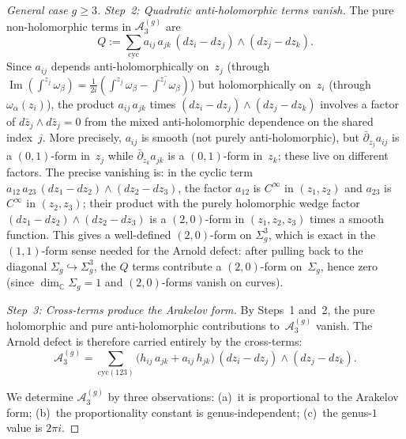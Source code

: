 \begin{proof}[General case $g \geq 3$]
\emph{Step~2: Quadratic anti-holomorphic terms vanish.}
The pure non-holomorphic terms in $\mathcal{A}_3^{(g)}$ are
\[
Q := \sum_{\mathrm{cyc}} a_{ij}\,a_{jk}\,(dz_i - dz_j)
\wedge (dz_j - dz_k).
\]
Since $a_{ij}$ depends anti-holomorphically on~$z_j$
(through $\operatorname{Im}(\int^{z_j}\omega_\beta)
= \frac{1}{2i}(\int^{z_j}\omega_\beta
 - \overline{\int^{z_j}\omega_\beta})$)
but holomorphically on~$z_i$ (through $\omega_\alpha(z_i)$),
the product $a_{ij}\,a_{jk}$ times $(dz_i - dz_j)
\wedge (dz_j - dz_k)$ involves a factor of
$d\bar{z}_j \wedge d\bar{z}_j = 0$ from the mixed anti-holomorphic
dependence on the shared index~$j$. More precisely,
$a_{ij}$ is smooth (not purely anti-holomorphic), but
$\bar\partial_{z_j}a_{ij}$ is a $(0,1)$-form in~$z_j$
while $\bar\partial_{z_k}a_{jk}$ is a $(0,1)$-form in~$z_k$;
these live on different factors.
The precise vanishing is: in the cyclic term
$a_{12}\,a_{23}\,(dz_1 - dz_2) \wedge (dz_2 - dz_3)$,
the factor $a_{12}$ is $C^\infty$ in $(z_1, z_2)$ and
$a_{23}$ is $C^\infty$ in $(z_2, z_3)$; their product
with the purely holomorphic wedge factor
$(dz_1 - dz_2) \wedge (dz_2 - dz_3)$ is a
$(2,0)$-form in $(z_1, z_2, z_3)$ times a smooth function.
This gives a well-defined $(2,0)$-form on $\Sigma_g^3$,
which is exact in the $(1,1)$-form sense needed for the
Arnold defect: after pulling back to the diagonal
$\Sigma_g \hookrightarrow \Sigma_g^3$, the $Q$ terms
contribute a $(2,0)$-form on~$\Sigma_g$, hence zero
(since $\dim_{\mathbb{C}} \Sigma_g = 1$ and
$(2,0)$-forms vanish on curves).

\emph{Step~3: Cross-terms produce the Arakelov form.}
By Steps~1 and~2, the pure holomorphic and pure
anti-holomorphic contributions to~$\mathcal{A}_3^{(g)}$
vanish. The Arnold defect is therefore carried entirely
by the cross-terms:
\begin{equation}\label{eq:cross-terms-explicit}
\mathcal{A}_3^{(g)} = \sum_{\mathrm{cyc}(123)}
\bigl(h_{ij}\,a_{jk} + a_{ij}\,h_{jk}\bigr)\,
(dz_i - dz_j) \wedge (dz_j - dz_k).
\end{equation}

We determine $\mathcal{A}_3^{(g)}$ by three observations:
(a)~it is proportional to the Arakelov form;
(b)~the proportionality constant is genus-independent;
(c)~the genus-$1$ value is $2\pi i$.


\end{proof}
